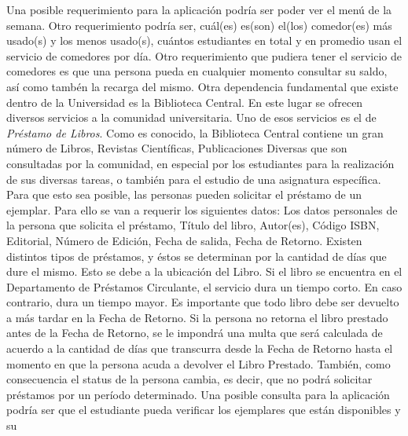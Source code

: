 \documentclass[12pt,a4paper,spanish]{article}
\begin{document}
\newline  
\indent Una posible requerimiento para la aplicaci\'on podr\'ia ser
poder ver el men\'u de la semana. Otro requerimiento podr\'ia ser,
cu\'al(es) es(son) el(los) comedor(es) m\'as usado(s) y los menos
usado(s), cu\'antos estudiantes  en total y en promedio usan el servicio de comedores por
d\'ia.
\newline
\newline
\indent Otro requerimiento que pudiera tener el servicio de comedores
es que una persona pueda en cualquier momento consultar su saldo,
as\'i como tamb\'en la recarga del mismo.
\newline
\newline
\indent Otra dependencia fundamental que existe dentro de la
Universidad es la Biblioteca Central. En este lugar se ofrecen
diversos servicios a la comunidad universitaria. Uno de esos servicios
es el de \emph{Pr\'estamo de Libros}. Como es conocido, la Biblioteca
Central contiene un gran n\'umero de Libros, Revistas Cient\'ificas,
Publicaciones Diversas que son consultadas por la comunidad, en
especial por los estudiantes para la realizaci\'on de sus diversas
tareas, o tambi\'en para el estudio de una asignatura
espec\'ifica. Para que esto sea posible, las personas pueden solicitar
el pr\'estamo de un ejemplar. Para ello se van a requerir los
siguientes datos: Los datos personales de la persona que solicita el
pr\'estamo,  T\'itulo del libro, Autor(es),
C\'odigo ISBN, Editorial, N\'umero de Edici\'on, Fecha de salida,
Fecha de Retorno. Existen distintos tipos de pr\'estamos, y \'estos se
determinan por la cantidad de d\'ias que dure el mismo. Esto se debe a
la ubicaci\'on del Libro. Si el libro se encuentra en el Departamento
de Pr\'estamos Circulante, el servicio dura un tiempo corto. En caso
contrario, dura un tiempo mayor. Es importante que todo libro debe ser devuelto a
m\'as tardar en la Fecha de Retorno. Si la persona no retorna el libro
prestado antes de la Fecha de Retorno, se le impondr\'a una multa que
ser\'a calculada de acuerdo a la cantidad de d\'ias que transcurra
desde la Fecha de Retorno hasta el momento en que la persona acuda a
devolver el Libro Prestado. Tambi\'en, como consecuencia el status de
la persona cambia, es decir, que no podr\'a solicitar pr\'estamos por
un per\'iodo determinado.   
\newline
\newline
\indent Una posible consulta para la aplicaci\'on podr\'ia ser que el
estudiante pueda verificar los ejemplares que est\'an disponibles y su
\end{document}
